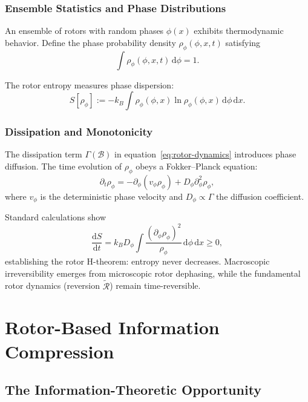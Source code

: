\documentclass[11pt,a4paper]{article}
\newcommand{\rev}[1]{\widetilde{#1}}           %
\newcommand{\Rotor}{\mathcal{R}}
\newcommand{\Biv}{\mathcal{B}}
\theoremstyle{definition}
\theoremstyle{plain}
\theoremstyle{remark}
\begin{document}
\subsubsection{Ensemble Statistics and Phase Distributions}

An ensemble of rotors with random phases $\phi(x)$ exhibits thermodynamic behavior. Define the phase probability density $\rho_\phi(\phi,x,t)$ satisfying
\begin{equation}
\int \rho_\phi(\phi,x,t)\, \mathrm{d}\phi = 1.
\end{equation}

The rotor entropy measures phase dispersion:
\begin{equation}
S[\rho_\phi] := -k_B \int \rho_\phi(\phi,x) \ln \rho_\phi(\phi,x)\, \mathrm{d}\phi\, \mathrm{d}x.
\end{equation}

\subsubsection{Dissipation and Monotonicity}

The dissipation term $\Gamma(\Biv)$ in equation~\eqref{eq:rotor-dynamics} introduces phase diffusion. The time evolution of $\rho_\phi$ obeys a Fokker--Planck equation:
\begin{equation}
\partial_t \rho_\phi = -\partial_\phi\!\left(v_\phi \rho_\phi\right) + D_\phi \partial_\phi^2 \rho_\phi,
\end{equation}
where $v_\phi$ is the deterministic phase velocity and $D_\phi \propto \Gamma$ the diffusion coefficient.

Standard calculations show
\begin{equation}
\frac{\mathrm{d}S}{\mathrm{d}t} = k_B D_\phi \int \frac{(\partial_\phi \rho_\phi)^2}{\rho_\phi}\, \mathrm{d}\phi\, \mathrm{d}x \geq 0,
\end{equation}
establishing the rotor H-theorem: entropy never decreases. Macroscopic irreversibility emerges from microscopic rotor dephasing, while the fundamental rotor dynamics (reversion $\rev{\Rotor}$) remain time-reversible.

\vspace{1em}

\section{Rotor-Based Information Compression}\label{sec:compression}

\subsection{The Information-Theoretic Opportunity}
\end{document}
